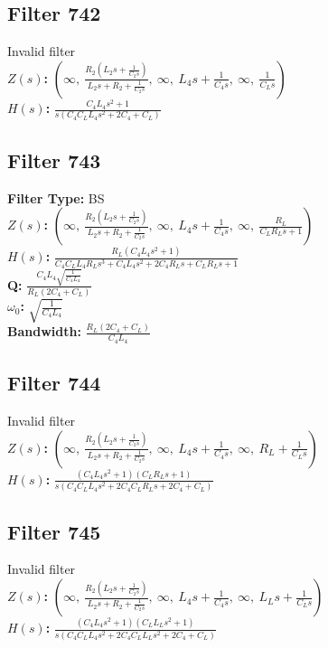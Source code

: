 \documentclass{article}
\begin{document}
\subsection*{Filter 742}
Invalid filter \\ 
\textbf{$Z(s)$:} $\left( \infty, \  \frac{R_{2} \left(L_{2} s + \frac{1}{C_{2} s}\right)}{L_{2} s + R_{2} + \frac{1}{C_{2} s}}, \  \infty, \  L_{4} s + \frac{1}{C_{4} s}, \  \infty, \  \frac{1}{C_{L} s}\right)$ \\ 
\textbf{$H(s)$:} $\frac{C_{4} L_{4} s^{2} + 1}{s \left(C_{4} C_{L} L_{4} s^{2} + 2 C_{4} + C_{L}\right)}$ \\ 
\subsection*{Filter 743}
\textbf{Filter Type:} BS \\ 
\textbf{$Z(s)$:} $\left( \infty, \  \frac{R_{2} \left(L_{2} s + \frac{1}{C_{2} s}\right)}{L_{2} s + R_{2} + \frac{1}{C_{2} s}}, \  \infty, \  L_{4} s + \frac{1}{C_{4} s}, \  \infty, \  \frac{R_{L}}{C_{L} R_{L} s + 1}\right)$ \\ 
\textbf{$H(s)$:} $\frac{R_{L} \left(C_{4} L_{4} s^{2} + 1\right)}{C_{4} C_{L} L_{4} R_{L} s^{3} + C_{4} L_{4} s^{2} + 2 C_{4} R_{L} s + C_{L} R_{L} s + 1}$ \\ 
\textbf{Q:} $\frac{C_{4} L_{4} \sqrt{\frac{1}{C_{4} L_{4}}}}{R_{L} \left(2 C_{4} + C_{L}\right)}$ \\ 
\textbf{$\omega_0$:} $\sqrt{\frac{1}{C_{4} L_{4}}}$ \\ 
\textbf{Bandwidth:} $\frac{R_{L} \left(2 C_{4} + C_{L}\right)}{C_{4} L_{4}}$ \\ 
\subsection*{Filter 744}
Invalid filter \\ 
\textbf{$Z(s)$:} $\left( \infty, \  \frac{R_{2} \left(L_{2} s + \frac{1}{C_{2} s}\right)}{L_{2} s + R_{2} + \frac{1}{C_{2} s}}, \  \infty, \  L_{4} s + \frac{1}{C_{4} s}, \  \infty, \  R_{L} + \frac{1}{C_{L} s}\right)$ \\ 
\textbf{$H(s)$:} $\frac{\left(C_{4} L_{4} s^{2} + 1\right) \left(C_{L} R_{L} s + 1\right)}{s \left(C_{4} C_{L} L_{4} s^{2} + 2 C_{4} C_{L} R_{L} s + 2 C_{4} + C_{L}\right)}$ \\ 
\subsection*{Filter 745}
Invalid filter \\ 
\textbf{$Z(s)$:} $\left( \infty, \  \frac{R_{2} \left(L_{2} s + \frac{1}{C_{2} s}\right)}{L_{2} s + R_{2} + \frac{1}{C_{2} s}}, \  \infty, \  L_{4} s + \frac{1}{C_{4} s}, \  \infty, \  L_{L} s + \frac{1}{C_{L} s}\right)$ \\ 
\textbf{$H(s)$:} $\frac{\left(C_{4} L_{4} s^{2} + 1\right) \left(C_{L} L_{L} s^{2} + 1\right)}{s \left(C_{4} C_{L} L_{4} s^{2} + 2 C_{4} C_{L} L_{L} s^{2} + 2 C_{4} + C_{L}\right)}$ \\ 
\end{document}
